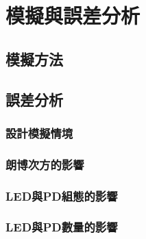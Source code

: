 

\chapter{模擬與誤差分析}
\label{chp:4}

\section{模擬方法}



\section{誤差分析}
\subsection{設計模擬情境}


\subsection{朗博次方的影響}

\subsection{LED與PD組態的影響}

\subsection{LED與PD數量的影響}

